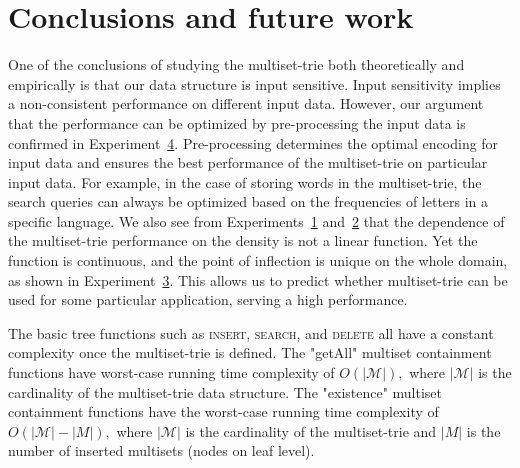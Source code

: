 \section{Conclusions and future work} \label{c:conclusions}

%
One of the conclusions of studying the multiset-trie both theoretically and empirically is that our data structure is input sensitive. Input sensitivity implies a non-consistent performance on different input data. However, our argument that the performance can be optimized by pre-processing the input data is confirmed in  Experiment~\hyperref[ss:exp3]{4}. Pre-processing determines the optimal encoding for input data and ensures the best performance of the multiset-trie on particular input data. For example, in the case of storing words in the multiset-trie, the search queries can always be optimized based on the frequencies of letters in a specific language. We also see from Experiments~\hyperref[s:exp1]{1} and~\hyperref[s:exp2]{2} that the dependence of the multiset-trie performance on the density is not a linear function. Yet the function is continuous, and the point of inflection is unique on the whole domain, as shown in Experiment~\hyperref[s:exp3]{3}. This allows us to predict whether multiset-trie can be used for some particular application, serving a high performance. 

%
The basic tree functions such as \textsc{insert}, \textsc{search}, and \textsc{delete} all have a constant complexity once the multiset-trie is defined. The "getAll" multiset containment functions have worst-case running time complexity of $O(|\mathcal{M}|),$ where $|\mathcal{M}|$ is the cardinality of the multiset-trie data structure. The "existence" multiset containment functions have the worst-case running time complexity of $O(|\mathcal{M}| - |M|),$ where $|\mathcal{M}|$ is the cardinality of the multiset-trie and $|M|$ is the number of inserted multisets (nodes on leaf level). 


